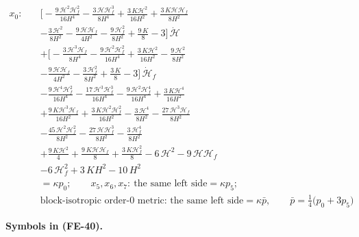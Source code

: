 \documentclass[
  10pt,
]{article}
\begin{document}
\[
\begin{aligned}
x_0:\quad &\Big[-\frac{9\,\mathcal{H}^{2}\mathcal{H}_f^{2}}{16H^{4}} -
 \frac{3\,\mathcal{H}\mathcal{H}_f^{3}}{8H^{4}} + \frac{3\,K\mathcal{H}^{2}}{16H^{2}} +
 \frac{3\,K\mathcal{H}\mathcal{H}_f}{8H^{2}} \\
 &- \frac{3\,\mathcal{H}^{2}}{8H^{2}} - \frac{9\,\mathcal{H}\mathcal{H}_f}{4H^{2}} -
 \frac{9\,\mathcal{H}_f^{2}}{8H^{2}} + \frac{9\,K}{8} - 3\Big]\,\dot{\mathcal{H}} \\
 &+ \Big[-\frac{3\,\mathcal{H}^{3}\mathcal{H}_f}{8H^{4}} -
 \frac{9\,\mathcal{H}^{2}\mathcal{H}_f^{2}}{16H^{4}} + \frac{3\,K\mathcal{H}^{2}}{16H^{2}} -
 \frac{9\,\mathcal{H}^{2}}{8H^{2}} \\
 &- \frac{9\,\mathcal{H}\mathcal{H}_f}{4H^{2}} - \frac{3\,\mathcal{H}_f^{2}}{8H^{2}} + \frac{3\,K}{8} -
 3\Big]\,\dot{\mathcal{H}}_f \\
 &-\frac{9\,\mathcal{H}^{4}\mathcal{H}_f^{2}}{16H^{4}} -
 \frac{17\,\mathcal{H}^{3}\mathcal{H}_f^{3}}{16H^{4}} -
 \frac{9\,\mathcal{H}^{2}\mathcal{H}_f^{4}}{16H^{4}} + \frac{3\,K\mathcal{H}^{4}}{16H^{2}} \\
 &+ \frac{9\,K\mathcal{H}^{3}\mathcal{H}_f}{16H^{2}} +
 \frac{3\,K\mathcal{H}^{2}\mathcal{H}_f^{2}}{16H^{2}} - \frac{3\,\mathcal{H}^{4}}{8H^{2}} -
 \frac{27\,\mathcal{H}^{3}\mathcal{H}_f}{8H^{2}} \\
 &- \frac{45\,\mathcal{H}^{2}\mathcal{H}_f^{2}}{8H^{2}} -
 \frac{27\,\mathcal{H}\mathcal{H}_f^{3}}{8H^{2}} - \frac{3\,\mathcal{H}_f^{4}}{8H^{2}} \\
 &+ \frac{9\,K\mathcal{H}^{2}}{4} + \frac{9\,K\mathcal{H}\mathcal{H}_f}{8} +
 \frac{3\,K\mathcal{H}_f^{2}}{8} - 6\,\mathcal{H}^{2} - 9\,\mathcal{H}\mathcal{H}_f \\
 &- 6\,\mathcal{H}_f^{2} + 3\,KH^{2} - 10\,H^{2} \\
 &= \kappa p_0;\qquad x_5, x_6, x_7:\ \text{the same left side} = \kappa p_5; \\
 &\text{block-isotropic order-0 metric: the same left side} = \kappa\bar p,\qquad \bar p =
 \tfrac14\big(p_0 + 3p_5\big)
\end{aligned} \tag{FE-40}
\]

\textbf{Symbols in (FE-40).}
\end{document}
